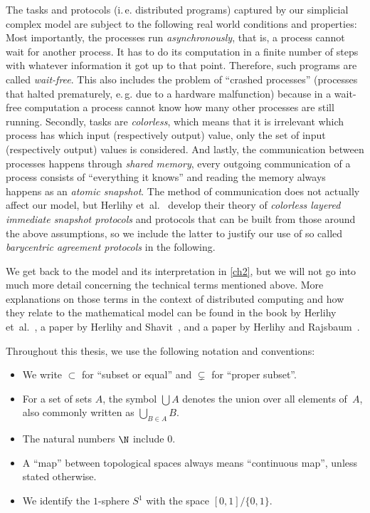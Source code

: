The tasks and protocols (i.\,e. distributed programs) captured by our simplicial
complex model are subject to the following real world conditions and properties:
Most importantly, the processes run \emph{asynchronously}, that is, a process
cannot wait for another process. It has to do its computation in a finite number
of steps with whatever information it got up to that point. Therefore, such
programs are called \emph{wait-free}. This also includes the problem of
\enquote{crashed processes} (processes that halted prematurely, e.\,g. due to
a hardware malfunction) because in a wait-free computation a process cannot
know how many other processes are still running. Secondly, tasks are
\emph{colorless}, which means that it is irrelevant which process has which
input (respectively output) value, only the set of input (respectively output)
values is considered. And lastly, the communication between processes happens
through \emph{shared memory}, every outgoing communication of a process consists
of \enquote{everything it knows} and reading the memory always happens as an
\emph{atomic snapshot}. The method of communication does not actually affect
our model, but Herlihy et~al.~\cite{bookc:herlihyetal13} develop their theory of
\emph{colorless layered immediate snapshot \mbox{protocols}} and protocols that can be
built from those around the above assumptions, so we include the latter to
justify our use of so called \emph{barycentric agreement protocols} in the
following.

We get back to the model and its interpretation in \cref{ch2}, but we will not
go into much more detail concerning the technical terms mentioned above.
More explanations on those terms in the context of distributed computing and how
they relate to the mathematical model can be found in the book by
Herlihy et~al.~\cite{bookc:herlihyetal13}, a paper by
Herlihy and Shavit~\cite{paper:herlihyshavit99}, and a paper by
Herlihy and Rajsbaum~\cite{paper:herlihyrajsbaum03}.

\bigskip
Throughout this thesis, we use the following notation and conventions:
\begin{itemize}
    \item
        We write $\subset$ for \enquote{subset or equal}
        and $\subsetneq$ for \enquote{proper subset}.
        
    \item
        For a set of sets $A$, the symbol $\bigcup A$ denotes the
        union over all elements of~$A$, also commonly written as
        $\bigcup_{B\in A} B$.
        
    \item
        The natural numbers $\N$ include $0$.
        
    \item
        A \enquote{map} between topological spaces always means
        \enquote{continuous map}, unless stated otherwise.
        
    \item
        We identify the $1$-sphere $S^1$ with the space $[0,1]/\{0,1\}$.
\end{itemize}

